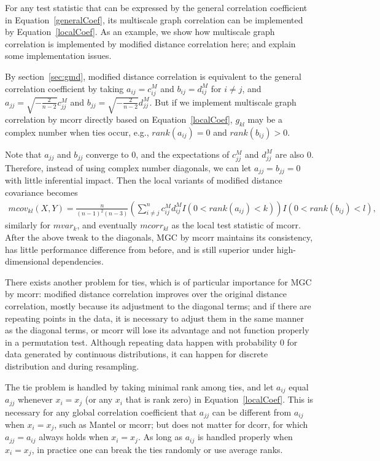 \documentclass[11pt]{article}
\begin{document}
For any test statistic that can be expressed by the general correlation coefficient in Equation~\ref{generalCoef}, its multiscale graph correlation can be implemented by Equation~\ref{localCoef}. As an example, we show how multiscale graph correlation is implemented by modified distance correlation here; and explain some implementation issues.

By section~\ref{sec:gmd}, modified distance correlation is equivalent to the general correlation coefficient by taking $a_{ij}=c^{M}_{ij}$ and $b_{ij}=d^{M}_{ij}$ for $i \neq j$, and $a_{jj}=\sqrt{-\frac{2}{n-2}}c^{M}_{jj}$ and $b_{jj}=\sqrt{-\frac{2}{n-2}}d^{M}_{jj}$. But if we implement multiscale graph correlation by mcorr directly based on Equation~\ref{localCoef}, $g_{kl}$ may be a complex number when ties occur, e.g., $rank(a_{ij})=0$ and $rank(b_{ij})>0$.

Note that $a_{jj}$ and $b_{jj}$ converge to $0$, and the expectations of $c^{M}_{jj}$ and $d^{M}_{jj}$ are also $0$. Therefore, instead of using complex number diagonals, we can let $a_{jj}=b_{jj}=0$ with little inferential impact. Then the local variants of modified distance covariance becomes
\begin{align*}
mcov_{kl}(X,Y) = \frac{n}{(n-1)^2(n-3)}(\sum_{i \neq j}^{n}c^{M}_{ij}d^{M}_{ij}I(0<rank(a_{ij})<k))I(0<rank(b_{ij})<l),
\end{align*}
similarly for $mvar_{k}$, and eventually $mcorr_{kl}$ as the local test statistic of mcorr. After the above tweak to the diagonals, MGC by mcorr maintains its consistency, has little performance difference from before, and is still superior under high-dimensional dependencies.

There exists another problem for ties, which is of particular importance for MGC by mcorr: modified distance correlation improves over the original distance correlation, mostly because its adjustment to the diagonal terms; and if there are repeating points in the data, it is necessary to adjust them in the same manner as the diagonal terms, or mcorr will lose its advantage and not function properly in a permutation test. Although repeating data happen with probability $0$ for data generated by continuous distributions, it can happen for discrete distribution and during resampling.

The tie problem is handled by taking minimal rank among ties, and let $a_{ij}$ equal $a_{jj}$ whenever $x_{i}=x_{j}$ (or any $x_{i}$ that is rank zero) in Equation~\ref{localCoef}. This is necessary for any global correlation coefficient that $a_{jj}$ can be different from $a_{ij}$ when $x_{i}=x_{j}$, such as Mantel or mcorr; but does not matter for dcorr, for which $a_{jj}=a_{ij}$ always holds when $x_{i}=x_{j}$. As long as $a_{ij}$ is handled properly when $x_{i}=x_{j}$, in practice one can break the ties randomly or use average ranks.
\end{document}
